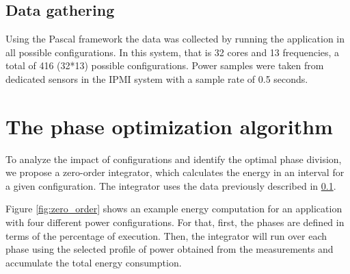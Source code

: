 \subsection{Data gathering} \label{sec:data_gathering}

Using the Pascal framework \cite{electronics11050689} the data was collected by running the application in all possible configurations. In this system, that is 32 cores and 13 frequencies, a total of 416 (32*13) possible configurations. Power samples were taken from dedicated sensors in the IPMI system with a sample rate of 0.5 seconds.


\section{The phase optimization algorithm} \label{sec:heuristic}
To analyze the impact of configurations and identify the optimal phase division, we propose a zero-order integrator, which calculates the energy in an interval for a given configuration. The integrator uses the data previously described in \cref{sec:data_gathering}.

Figure \ref{fig:zero_order} shows an example energy computation for an application with four different power configurations. For that, first, the phases are defined in terms of the percentage of execution. Then, the integrator will run over each phase using the selected profile of power obtained from the measurements and accumulate the total energy consumption.



